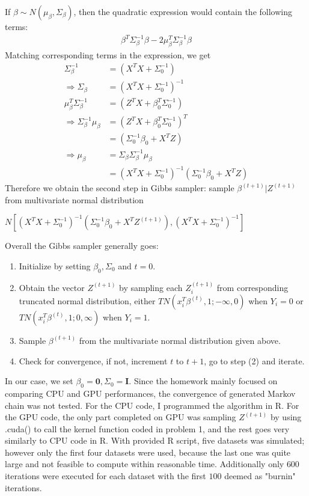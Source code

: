 \documentclass[12pt]{article}
\begin{document}
If $\beta \sim N(\mu_\beta, \Sigma_\beta)$, then the quadratic expression would contain the following terms:
\begin{align*}
	\beta^T\Sigma_\beta^{-1}\beta -2\mu_\beta^T\Sigma_\beta^{-1}\beta
\end{align*}
Matching corresponding terms in the expression, we get
\begin{align*}
	\Sigma_\beta^{-1} &= (X^TX+\Sigma_0^{-1}) \\
	\Rightarrow \Sigma_\beta &= (X^TX+\Sigma_0^{-1})^{-1} \\
	\mu_\beta^T\Sigma_\beta^{-1} &= (Z^TX+\beta_0^T\Sigma_0^{-1}) \\
	\Rightarrow \Sigma_\beta^{-1}\mu_\beta &= (Z^TX+\beta_0^T\Sigma_0^{-1})^T \\
	&= (\Sigma_0^{-1}\beta_0 + X^TZ) \\
	\Rightarrow \mu_\beta &= \Sigma_\beta\Sigma_\beta^{-1}\mu_\beta \\
	&=(X^TX+\Sigma_0^{-1})^{-1}(\Sigma_0^{-1}\beta_0 + X^TZ)
\end{align*}
Therefore we obtain the second step in Gibbs sampler: sample $\beta^{(t+1)}|Z^{(t+1)}$ from multivariate normal distribution
\begin{center}
	$N[(X^TX+\Sigma_0^{-1})^{-1}(\Sigma_0^{-1}\beta_0 + X^TZ^{(t+1)}), (X^TX+\Sigma_0^{-1})^{-1}]$
\end{center} 
Overall the Gibbs sampler generally goes:
\begin{enumerate}[(1)]
	\item Initialize by setting $\beta_0, \Sigma_0$ and $t= 0$.
	\item Obtain the vector $Z^{(t+1)}$ by sampling each $Z_i^{(t+1)}$ from corresponding truncated normal distribution, either $TN(x_i^T\beta^{(t)}, 1; -\infty, 0)$ when $Y_i = 0$ or $TN(x_i^T\beta^{(t)}, 1; 0, \infty)$ when $Y_i = 1$.
	\item Sample $\beta^{(t+1)}$ from the multivariate normal distribution given above.
	\item Check for convergence, if not, increment $t$ to $t+1$, go to step (2) and iterate.
\end{enumerate}
In our case, we set $\beta_0 = \mathbf{0}, \Sigma_0 = \mathbf{I}$. Since the homework mainly focused on comparing CPU and GPU performances, the convergence of generated Markov chain was not tested.
For the CPU code, I programmed the algorithm in R. For the GPU code, the only part completed on GPU was sampling $Z^{(t+1)}$ by using .cuda() to call the kernel function coded in problem 1, and the rest goes very similarly to CPU code in R. With provided R script, five datasets was simulated; however only the first four datasets were used, because the last one was quite large and not feasible to compute within reasonable time. Additionally only $600$ iterations were executed for each dataset with the first $100$ deemed as "burnin" iterations. 
\end{document}
